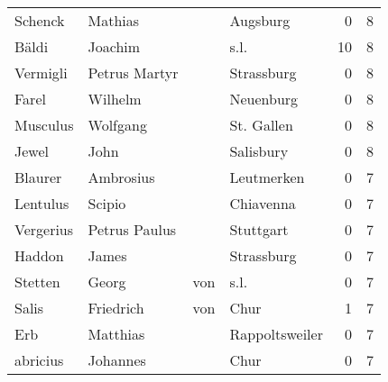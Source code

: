 \begin{tabular}{llllrr}
                  Schenck &                            Mathias &             &                                    Augsburg &          0 &         8 \\
                    Bäldi &                            Joachim &             &                                        s.l. &         10 &         8 \\
                 Vermigli &                      Petrus Martyr &             &                                  Strassburg &          0 &         8 \\
                    Farel &                            Wilhelm &             &                                   Neuenburg &          0 &         8 \\
                 Musculus &                           Wolfgang &             &                                  St. Gallen &          0 &         8 \\
                    Jewel &                               John &             &                                   Salisbury &          0 &         8 \\
                  Blaurer &                          Ambrosius &             &                                  Leutmerken &          0 &         7 \\
                 Lentulus &                             Scipio &             &                                   Chiavenna &          0 &         7 \\
                Vergerius &                      Petrus Paulus &             &                                   Stuttgart &          0 &         7 \\
                   Haddon &                              James &             &                                  Strassburg &          0 &         7 \\
                  Stetten &                              Georg &         von &                                        s.l. &          0 &         7 \\
                    Salis &                          Friedrich &         von &                                        Chur &          1 &         7 \\
                      Erb &                           Matthias &             &                              Rappoltsweiler &          0 &         7 \\
                 abricius &                           Johannes &             &                                        Chur &          0 &         7 \\

\end{tabular}
